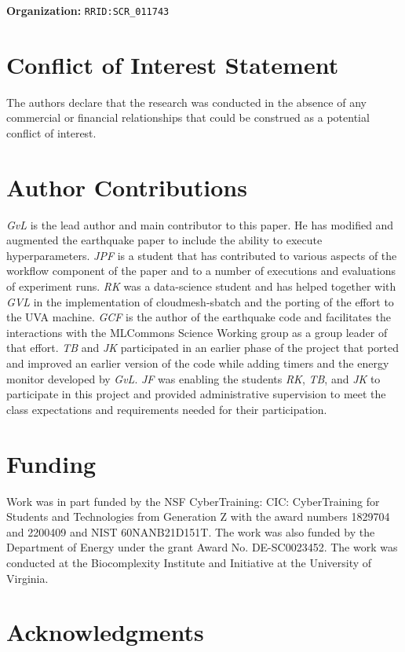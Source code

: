 \documentclass[utf8]{FrontiersinVancouver} %
\begin{document}
{\bf Organization:} \verb|RRID:SCR_011743|

\section*{Conflict of Interest Statement}

The authors declare that the research was conducted in the absence of any commercial or financial relationships that could be construed as a potential conflict of interest.

\section*{Author Contributions}

{\em GvL} is the lead author and main contributor to this paper. He has modified and augmented the earthquake paper to include the ability to execute hyperparameters. {\em JPF} is a student that has contributed to various aspects of the workflow component of the paper and to a number of executions and evaluations of experiment runs. {\em RK} was a data-science student and has helped together with {\em GVL} in the implementation of cloudmesh-sbatch and the porting of the effort to the UVA machine.  {\em GCF} is the author of the earthquake code and facilitates the interactions with the MLCommons Science Working group as a group leader of that effort. {\em TB} and {\em JK} participated in an earlier phase of the project that ported and improved an earlier version of the code while adding timers and the energy monitor developed by {\em GvL}. {\em JF} was enabling the students {\em RK}, {\em TB}, and {\em JK} to participate in this project and provided administrative supervision to meet the class expectations and requirements needed for their participation.

\section*{Funding}

Work was in part funded by the NSF CyberTraining: CIC: CyberTraining for Students and Technologies from Generation Z with the award numbers 1829704 and 2200409 and NIST 60NANB21D151T.  The work was also funded by the Department of Energy under the grant Award No. DE-SC0023452. The work was conducted at the Biocomplexity Institute and Initiative at the University of Virginia.

\section*{Acknowledgments}
\end{document}
